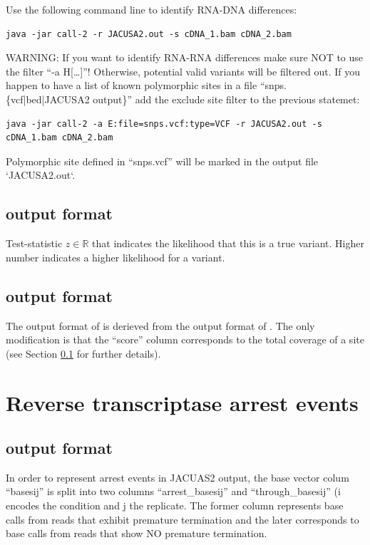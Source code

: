 \documentclass[10pt,a4paper]{article} \usepackage[utf8]{inputenc}
\begin{document}
Use the following command line to identify RNA-DNA differences:
\begin{verbatim}
java -jar call-2 -r JACUSA2.out -s cDNA_1.bam cDNA_2.bam
\end{verbatim}
WARNING: If you want to identify RNA-RNA differences make sure NOT to use the filter ``-a H[\ldots]''! 
Otherwise, potential valid variants will be filtered out. If you happen to have a list of known 
polymorphic sites in a file ``snps.\{vcf|bed|JACUSA2 output\}'' add the exclude site filter to the previous 
statemet:
\begin{verbatim}
java -jar call-2 -a E:file=snps.vcf:type=VCF -r JACUSA2.out -s cDNA_1.bam cDNA_2.bam
\end{verbatim}
Polymorphic site defined in ``snps.vcf'' will be marked in the output file `JACUSA2.out`.

\subsection{\call{*} output format}\label{sec:call_format}
Test-statistic $z \in \mathbb{R}$ that indicates the likelihood that this is a
  true variant. Higher number indicates a higher likelihood for a variant.
\subsection{\pileup output format}\label{sec:pileup_format}
The output format of \pileup is derieved from the output format of \call{*}. The only modification
is that the ``score'' column corresponds to the total coverage of a site (see Section
\ref{sec:call_format} for further details).
\section{Reverse transcriptase arrest events}
\subsection{\rtarrest output format}
In order to represent arrest events in JACUAS2 output, the base vector colum ``basesij''  is split
into two columns ``arrest\_basesij'' and ``through\_basesij'' (i encodes the condition and j the
replicate.
The former column represents base calls from reads that exhibit premature termination and the later
corresponds to base calls from reads that show NO premature termination.
\end{document}
